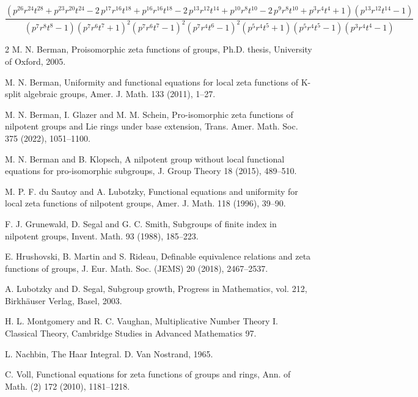 \documentclass{article}
\begin{document}
\[
\frac{{\left(p^{26} r^{24} t^{28} + p^{23} r^{20} t^{24} - 2 \, p^{17} r^{16} t^{18} + p^{16} r^{16} t^{18} - 2 \, p^{13} r^{12} t^{14} + p^{10} r^{8} t^{10} - 2 \, p^{9} r^{8} t^{10} + p^{3} r^{4} t^{4} + 1\right)} {\left(p^{13} r^{12} t^{14} - 1\right)}}{{\left(p^{7} r^{8} t^{8} - 1\right)} {\left(p^{7} r^{6} t^{7} + 1\right)}^{2} {\left(p^{7} r^{6} t^{7} - 1\right)}^{2} {\left(p^{7} r^{4} t^{6} - 1\right)}^{2} {\left(p^{5} r^{4} t^{5} + 1\right)} {\left(p^{5} r^{4} t^{5} - 1\right)} {\left(p^{3} r^{4} t^{4} - 1\right)}}
\]
\begin{thebibliography}{2}
 M. N. Berman,
Proisomorphic zeta functions of groups, Ph.D. thesis, University of Oxford,
2005.

M. N. Berman,
Uniformity and functional equations for local zeta functions of
K-split
algebraic groups, Amer. J. Math.
133
(2011), 1–27.

 M. N. Berman, I. Glazer and M. M. Schein, Pro-isomorphic zeta functions of nilpotent groups and Lie rings under base extension, Trans. Amer. Math. Soc. 375 (2022), 1051–1100.

M. N. Berman and B. Klopsch,
A nilpotent group without local functional equations
for pro-isomorphic subgroups, J. Group Theory
18
(2015), 489–510.

 M. P. F. du Sautoy and A. Lubotzky, Functional equations and uniformity for
local zeta functions of nilpotent groups, Amer. J. Math. 118 (1996), 39–90.

 F. J. Grunewald, D. Segal and G. C. Smith, Subgroups of finite index in nilpotent groups,
Invent. Math. 93 (1988), 185–223.

 E. Hrushovski, B. Martin and S. Rideau,
Definable equivalence relations and
zeta functions of groups, J. Eur. Math. Soc. (JEMS)
20
(2018), 2467–2537. 

A. Lubotzky and D. Segal, Subgroup growth, Progress in Mathematics, vol. 212,
 Birkhäuser Verlag, Basel, 2003.

 H. L. Montgomery and R. C. Vaughan, Multiplicative Number Theory I. Classical Theory, Cambridge Studies in Advanced Mathematics 97.

L. Nachbin, The Haar Integral. D. Van Nostrand, 1965.

 C. Voll,
Functional equations for zeta
functions of groups and rings, Ann. of Math.
(2)
172
(2010), 1181–1218.
\end{thebibliography}
\end{document}
